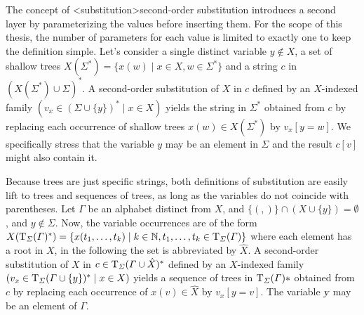 \documentclass[../document.tex]{subfiles}
\begin{document}
    The concept of <substitution>{second-order substitution} introduces a second layer by parameterizing the values before inserting them.
    For the scope of this thesis, the number of parameters for each value is limited to exactly one to keep the definition simple.
    Let's consider a single distinct variable \(y \notin X\), a set of shallow trees \(X(\varSigma^*) = \{ x(w) \mid x \in X, w \in \Sigma^* \}\) and a string \(c\) in \((X(\varSigma^*) \cup \varSigma)^*\).
    A second-order substitution of \(X\) in \(c\) defined by an \(X\)-indexed family \((v_x \in (\varSigma \cup \{y\})^* \mid x \in X)\) yields the string in \(\varSigma^*\) obtained from \(c\) by replacing each occurrence of shallow trees \(x(w) \in X(\varSigma^*)\) by \(v_x[y=w]\).
    We specifically stress that the variable \(y\) may be an element in \(\varSigma\) and the result \(c[v]\) might also contain it.

    Because trees are just specific strings, both definitions of substitution are easily lift to trees and sequences of trees, as long as the variables do not coincide with parentheses.
    Let \(\varGamma\) be an alphabet distinct from \(X\), and \(\{ (, ) \} \cap (X \cup \{y\}) = \emptyset\), and \(y \notin \varSigma\).
    Now, the variable occurrences are of the form \(X(\operatorname{T}_\varSigma(\varGamma)^*) = \{x(t_1, \ldots, t_k) \mid k \in \mathbb{N}, t_1, \ldots, t_k \in \operatorname{T}_{\varSigma}(\varGamma)\}\) where each element has a root in \(X\), in the following the set is abbreviated by \(\hat{X}\).
    A second-order substitution of \(X\) in \(c \in \operatorname{T}_\varSigma(\varGamma \cup \hat{X})^*\) defined by an \(X\)-indexed family \((v_x \in \operatorname{T}_\varSigma(\varGamma \cup \{y\})^* \mid x \in X)\) yields a sequence of trees in \(\operatorname{T}_\varSigma(\varGamma)*\) obtained from \(c\) by replacing each occurrence of \(x(v) \in \hat{X}\) by \(v_x[y=v]\).
    The variable \(\textsl{y}\) may be an element of \(\varGamma\).
\end{document}
